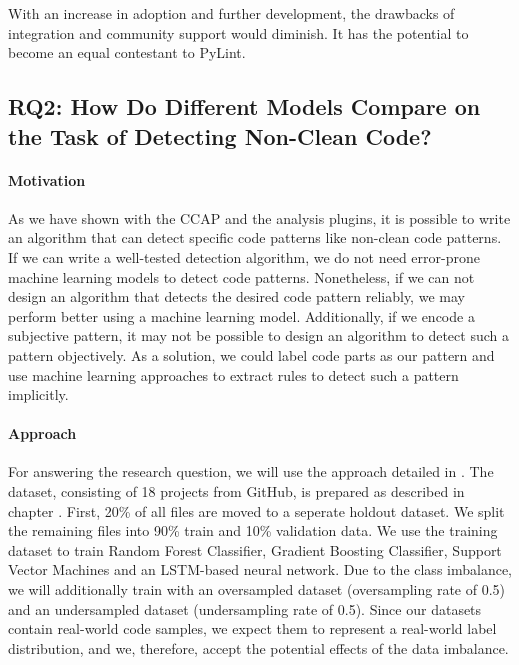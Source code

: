 With an increase in adoption and further development, the drawbacks of integration and community support would diminish. It has the potential to become an equal contestant to PyLint.

\subsection{RQ2: How Do Different Models Compare on the Task of Detecting Non-Clean Code?}\label{rq:2}
\paragraph{Motivation}
As we have shown with the CCAP and the analysis plugins, it is possible to write an algorithm that can detect specific code patterns like non-clean code patterns. If we can write a well-tested detection algorithm, we do not need error-prone machine learning models to detect code patterns. Nonetheless, if we can not design an algorithm that detects the desired code pattern reliably, we may perform better using a machine learning model. Additionally, if we encode a subjective pattern, it may not be possible to design an algorithm to detect such a pattern objectively. As a solution, we could label code parts as our pattern and use machine learning approaches to extract rules to detect such a pattern implicitly.


\paragraph{Approach}\label{par:approach}
For answering the research question, we will use the approach detailed in .  The dataset, consisting of 18 projects from GitHub, is prepared as described in chapter . First, 20\% of all files are moved to a seperate holdout dataset. We split the remaining files into 90\% train and 10\% validation data. We use the training dataset to train Random Forest Classifier, Gradient Boosting Classifier, Support Vector Machines and an LSTM-based neural network. Due to the class imbalance, we will additionally train with an oversampled dataset (oversampling rate of 0.5) and an undersampled dataset (undersampling rate of 0.5). Since our datasets contain real-world code samples, we expect them to represent a real-world label distribution, and we, therefore, accept the potential effects of the data imbalance. 

